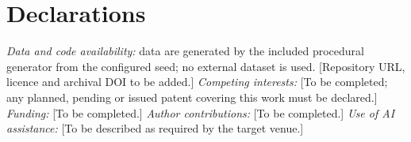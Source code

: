 \documentclass[journal]{IEEEtran}
\begin{document}
\section*{Declarations}
\emph{Data and code availability:} data are generated by the included procedural generator from the configured seed; no external dataset is used. [Repository URL, licence and archival DOI to be added.] \emph{Competing interests:} [To be completed; any planned, pending or issued patent covering this work must be declared.] \emph{Funding:} [To be completed.] \emph{Author contributions:} [To be completed.] \emph{Use of AI assistance:} [To be described as required by the target venue.]

\balance


\end{document}

